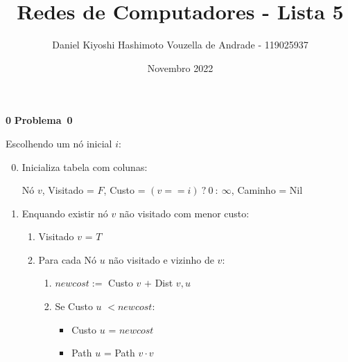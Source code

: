 \documentclass{article}
\title{Redes de Computadores - Lista 5}
\author{Daniel Kiyoshi Hashimoto Vouzella de Andrade - 119025937}
\date{Novembro 2022}
\newcommand{\blank}{\rule[0pt]{5em}{.3pt}}
\newcommand{\preamble}[2]{\noindent%
    Fiz esse trabalho com a ajuda de {\bfseries #1}
    e consultei {\bfseries #2}.
    A versão final do trabalho foi feita
    por mim de forma independente.
    Respostas sem no mínimo 3 frases de justificativa
    não contam ponto.
    \par\noindent Assinatura: \blank\blank\bigskip}
\newcounter{exe-list}
\newenvironment{exe}[2][Problema]
    {\newcommand{\opt}{(Opcional)}%
    \newcommand{\sketch}[1]{{\bfseries Rascunho:} ##1}%
    \medskip\par\noindent\ifthenelse{\equal{#1}{}}
        {\textbf{\large #2}}
        {\textbf{\large #1~#2}}%
    \medskip\par\noindent}
    {\medskip}
\begin{document}
\maketitle


\begin{exe}{0}
    Escolhendo um nó inicial \(i\):
    \begin{enumerate}
    \setcounter{enumi}{-1}
    \item Inicializa tabela com colunas: \par
        Nó \(v\),
        Visitado = \(F\),
        Custo = \((v == i) \:?\: 0 \::\: \infty\),
        Caminho = Nil
    \item Enquando existir nó \(v\) não visitado com menor custo:
        \begin{enumerate}
        \item Visitado \(v\) = \(T\)
        \item Para cada Nó \(u\) não visitado e vizinho de \(v\):
            \begin{enumerate}
                \item \(newcost :=\) Custo \(v\) \(+\) Dist \(v, u\)
                \item Se Custo \(u\) \(< newcost\):
                    \begin{itemize}
                        \item Custo \(u\) = \(newcost\)
                        \item Path \(u\) = Path \(v \cdot v\)
                    \end{itemize}
            \end{enumerate}
        \end{enumerate}
    \end{enumerate}
\end{exe}
\end{document}
